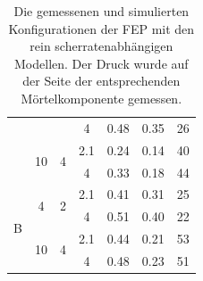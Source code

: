 \begin{table}[tb]
{\begin{tabular}{l c c c r r r}
                              &                     &                    & 4   & 0.48 & 0.35 &26\\
                              \addlinespace
                              & \multirow{2}{*}{10} & \multirow{2}{*}{4} & 2.1 & 0.24 & 0.14 &40\\
                              &                     &                    & 4   & 0.33 & 0.18 &44\\
     \cmidrule(lr){2-4}
     \cmidrule(lr){5-6}
     \cmidrule(lr){7-7}
    \multirow{4}{*}{\moertelB{} B} &  \multirow{2}{*}{4} & \multirow{2}{*}{2}  & 2.1 & 0.41 & 0.31 &25\\
                              &                     &                    & 4   & 0.51 & 0.40 &22\\
                              \addlinespace
                              & \multirow{2}{*}{10} & \multirow{2}{*}{4} & 2.1 & 0.44 & 0.21 &53\\
                              &                     &                    & 4   & 0.48 & 0.23 &51\\
    \bottomrule[1.5pt]
\end{tabular}}
    \caption{Die gemessenen und simulierten Konfigurationen der FEP mit den rein scherratenabhängigen Modellen. Der Druck wurde auf der Seite der entsprechenden Mörtelkomponente gemessen.}
    \label{fig:fepVergleich}
\end{table}
%
